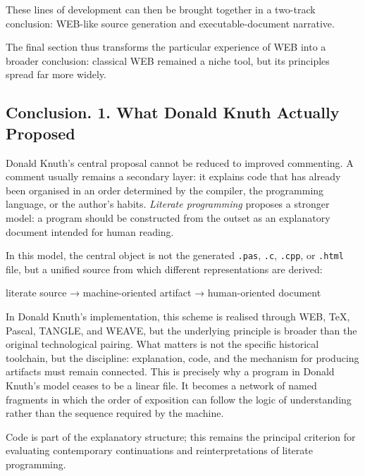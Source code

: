 \documentclass{ZGJournalArticle_2026}
\newenvironment{Shaded}{}{}
\newcommand{\NormalTok}[1]{#1}
\begin{document}
These lines of development can then be brought together in a two-track
conclusion: WEB-like source generation and executable-document
narrative.

The final section thus transforms the particular experience of WEB into
a broader conclusion: classical WEB remained a niche tool, but its
principles spread far more widely.

\subsection{Conclusion. 1. What Donald Knuth Actually
Proposed}\label{conclusion.-1.-what-donald-knuth-actually-proposed}

Donald Knuth's central proposal cannot be reduced to improved
commenting. A comment usually remains a secondary layer: it explains
code that has already been organised in an order determined by the
compiler, the programming language, or the author's habits.
\emph{Literate programming} proposes a stronger model: a program should
be constructed from the outset as an explanatory document intended for
human reading.

In this model, the central object is not the generated \texttt{.pas},
\texttt{.c}, \texttt{.cpp}, or \texttt{.html} file, but a unified source
from which different representations are derived:

\begin{Shaded}
\begin{Highlighting}[]
\NormalTok{literate source}
\NormalTok{  → machine{-}oriented artifact}
\NormalTok{  → human{-}oriented document}
\end{Highlighting}
\end{Shaded}

In Donald Knuth's implementation, this scheme is realised through WEB,
TeX, Pascal, TANGLE, and WEAVE, but the underlying principle is broader
than the original technological pairing. What matters is not the
specific historical toolchain, but the discipline: explanation, code,
and the mechanism for producing artifacts must remain connected. This is
precisely why a program in Donald Knuth's model ceases to be a linear
file. It becomes a network of named fragments in which the order of
exposition can follow the logic of understanding rather than the
sequence required by the machine.

Code is part of the explanatory structure; this remains the principal
criterion for evaluating contemporary continuations and
reinterpretations of literate programming.
\end{document}
